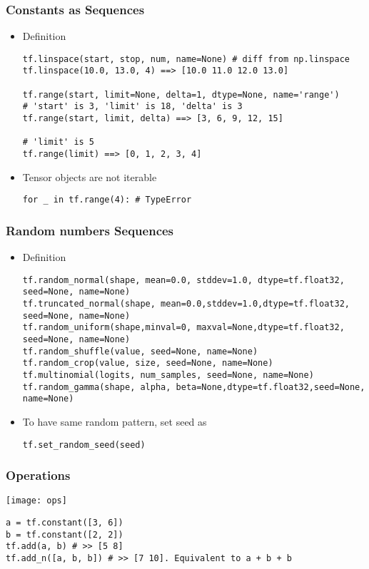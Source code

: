 \begin{frame}[fragile] \frametitle{Constants as Sequences}
\begin{itemize}
\item Definition
\begin{lstlisting}
tf.linspace(start, stop, num, name=None) # diff from np.linspace
tf.linspace(10.0, 13.0, 4) ==> [10.0 11.0 12.0 13.0]

tf.range(start, limit=None, delta=1, dtype=None, name='range')
# 'start' is 3, 'limit' is 18, 'delta' is 3
tf.range(start, limit, delta) ==> [3, 6, 9, 12, 15]

# 'limit' is 5
tf.range(limit) ==> [0, 1, 2, 3, 4]
\end{lstlisting}
\item Tensor objects are not iterable
\begin{lstlisting}
for _ in tf.range(4): # TypeError
\end{lstlisting}
\end{itemize}
\end{frame}


\begin{frame}[fragile] \frametitle{Random numbers Sequences}
\begin{itemize}
\item Definition
\begin{lstlisting}
tf.random_normal(shape, mean=0.0, stddev=1.0, dtype=tf.float32, seed=None, name=None)
tf.truncated_normal(shape, mean=0.0,stddev=1.0,dtype=tf.float32, seed=None, name=None)
tf.random_uniform(shape,minval=0, maxval=None,dtype=tf.float32, seed=None, name=None)
tf.random_shuffle(value, seed=None, name=None)
tf.random_crop(value, size, seed=None, name=None)
tf.multinomial(logits, num_samples, seed=None, name=None)
tf.random_gamma(shape, alpha, beta=None,dtype=tf.float32,seed=None, name=None)
\end{lstlisting}
\item To have same random pattern, set seed as
\begin{lstlisting}
tf.set_random_seed(seed)
\end{lstlisting}
\end{itemize}
\end{frame}

\begin{frame}[fragile] \frametitle{Operations}
\begin{center}
\texttt{[image: ops]}
\end{center}
\begin{lstlisting}
a = tf.constant([3, 6])
b = tf.constant([2, 2])
tf.add(a, b) # >> [5 8]
tf.add_n([a, b, b]) # >> [7 10]. Equivalent to a + b + b
\end{lstlisting}
\end{frame}


